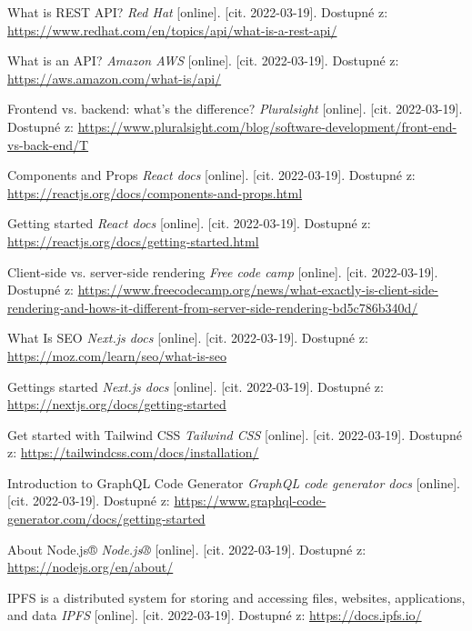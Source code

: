 \begin{thebibliography}{100}
     What is REST API? \textit{Red Hat} [online]. [cit. 2022-03-19]. Dostupné z: \url{https://www.redhat.com/en/topics/api/what-is-a-rest-api/}
    
     What is an API? \textit{Amazon AWS} [online]. [cit. 2022-03-19]. Dostupné z: \url{https://aws.amazon.com/what-is/api/}
    
     Frontend vs. backend: what's the difference? \textit{Pluralsight} [online]. [cit. 2022-03-19]. Dostupné z: \url{https://www.pluralsight.com/blog/software-development/front-end-vs-back-end/T}
    
     Components and Props \textit{React docs} [online]. [cit. 2022-03-19]. Dostupné z: \url{https://reactjs.org/docs/components-and-props.html}
    
     Getting started \textit{React docs} [online]. [cit. 2022-03-19]. Dostupné z: \url{https://reactjs.org/docs/getting-started.html}
    
     Client-side vs. server-side rendering \textit{Free code camp} [online]. [cit. 2022-03-19]. Dostupné z: \url{https://www.freecodecamp.org/news/what-exactly-is-client-side-rendering-and-hows-it-different-from-server-side-rendering-bd5c786b340d/}
    
     What Is SEO \textit{Next.js docs} [online]. [cit. 2022-03-19]. Dostupné z: \url{https://moz.com/learn/seo/what-is-seo}
    
     Gettings started \textit{Next.js docs} [online]. [cit. 2022-03-19]. Dostupné z: \url{https://nextjs.org/docs/getting-started}
    
     Get started with Tailwind CSS \textit{Tailwind CSS} [online]. [cit. 2022-03-19]. Dostupné z: \url{https://tailwindcss.com/docs/installation/}
    
     Introduction to GraphQL Code Generator \textit{GraphQL code generator docs} [online]. [cit. 2022-03-19]. Dostupné z: \url{https://www.graphql-code-generator.com/docs/getting-started}
    
     About Node.js® \textit{Node.js®} [online]. [cit. 2022-03-19]. Dostupné z: \url{https://nodejs.org/en/about/}
    
     IPFS is a distributed system for storing and accessing files, websites, applications, and data \textit{IPFS} [online]. [cit. 2022-03-19]. Dostupné z: \url{https://docs.ipfs.io/}
    

\end{thebibliography}
